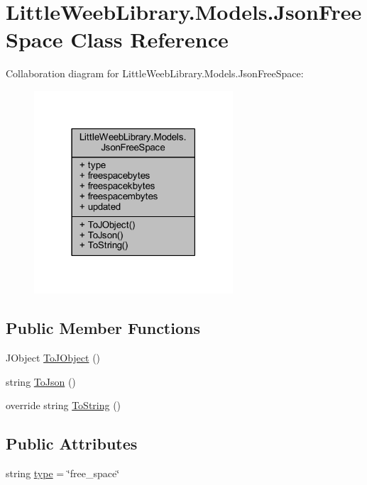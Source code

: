 \hypertarget{class_little_weeb_library_1_1_models_1_1_json_free_space}{}\section{Little\+Weeb\+Library.\+Models.\+Json\+Free\+Space Class Reference}
\label{class_little_weeb_library_1_1_models_1_1_json_free_space}


Collaboration diagram for Little\+Weeb\+Library.\+Models.\+Json\+Free\+Space\+:\nopagebreak
\begin{figure}[H]
\begin{center}
\leavevmode
\includegraphics[width=210pt]{class_little_weeb_library_1_1_models_1_1_json_free_space__coll__graph}
\end{center}
\end{figure}
\subsection*{Public Member Functions}
\begin{DoxyCompactItemize}
\item 
J\+Object \mbox{\hyperlink{class_little_weeb_library_1_1_models_1_1_json_free_space_a5deaf058a148e647128b1fca6f9fc722}{To\+J\+Object}} ()
\item 
string \mbox{\hyperlink{class_little_weeb_library_1_1_models_1_1_json_free_space_a3ab3c947402838a29e33684edaf16a54}{To\+Json}} ()
\item 
override string \mbox{\hyperlink{class_little_weeb_library_1_1_models_1_1_json_free_space_ab23fb33c2e1990fc09fb171193bee852}{To\+String}} ()
\end{DoxyCompactItemize}
\subsection*{Public Attributes}
\begin{DoxyCompactItemize}
\item 
string \mbox{\hyperlink{class_little_weeb_library_1_1_models_1_1_json_free_space_a22620db3979c7d52ee764555c29a940c}{type}} = \char`\"{}free\+\_\+space\char`\"{}
\end{DoxyCompactItemize}
